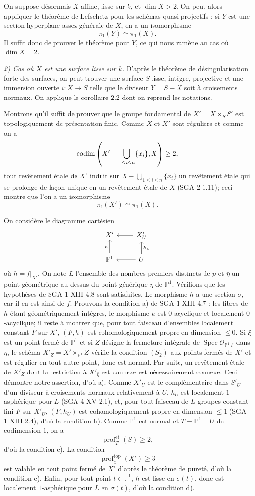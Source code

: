 \documentclass[11pt]{article}
\providecommand{\Spec}{\operatorname{Spec}}
\providecommand{\cO}{\mathcal O}
\providecommand{\et}{\mathrm{et}}
\providecommand{\prof}{\operatorname{prof}}
\begin{document}
On suppose désormais $X$ affine, lisse sur $k$, et $\dim X>2$. On peut alors appliquer le théorème de Lefschetz pour les schémas quasi-projectifs : si $Y$ est une section hyperplane assez générale de $X$, on a un isomorphisme
\[
 \pi_1(Y)\simeq \pi_1(X).
\]
Il suffit donc de prouver le théorème pour $Y$, ce qui nous ramène au cas où $\dim X=2$.

\emph{2) Cas où $X$ est une surface lisse sur $k$.} D'après le théorème de désingularisation forte des surfaces, on peut trouver une surface $S$ lisse, intègre, projective et une immersion ouverte $i:X\to S$ telle que le diviseur $Y=S-X$ soit à croisements normaux. On applique le corollaire 2.2 dont on reprend les notations.

Montrons qu'il suffit de prouver que le groupe fondamental de $X'=X\times_S S'$ est topologiquement de présentation finie. Comme $X$ et $X'$ sont réguliers et comme on a
\[
 \operatorname{codim}\left(X'-\bigcup_{1\le i\le n}\{x_i\},X\right)\ge2,
\]
tout revêtement étale de $X'$ induit sur $X-\bigcup_{1\le i\le n}\{x_i\}$ un revêtement étale qui se prolonge de façon unique en un revêtement étale de $X$ (SGA 2 1.11); ceci montre que l'on a un isomorphisme
\[
 \pi_1(X')\simeq \pi_1(X).
\]

On considère le diagramme cartésien
\[
\begin{tikzcd}
X' & X'_U \arrow[l]\\
\mathbb P^1 \arrow[u,"h"] & U \arrow[l] \arrow[u,"h_U"']
\end{tikzcd}
\]
où $h=f|_{X'}$. On note $L$ l'ensemble des nombres premiers distincts de $p$ et $\bar\eta$ un point géométrique au-dessus du point générique $\eta$ de $\mathbb P^1$. Vérifions que les hypothèses de SGA 1 XIII 4.8 sont satisfaites. Le morphisme $h$ a une section $\sigma$, car il en est ainsi de $f$. Prouvons la condition a) de SGA 1 XIII 4.7 : les fibres de $h$ étant géométriquement intègres, le morphisme $h$ est $0$-acyclique et localement $0$-acyclique; il reste à montrer que, pour tout faisceau d'ensembles localement constant $F$ sur $X'$, $(F,h)$ est cohomologiquement propre en dimension $\le0$. Si $\xi$ est un point fermé de $\mathbb P^1$ et si $Z$ désigne la fermeture intégrale de $\Spec \cO_{\mathbb P^1,\xi}$ dans $\bar\eta$, le schéma $X'_Z=X'\times_{\mathbb P^1}Z$ vérifie la condition $(S_2)$ aux points fermés de $X'$ et est régulier en tout autre point, donc est normal. Par suite, un revêtement étale de $X'_Z$ dont la restriction à $X'_{\bar\eta}$ est connexe est nécessairement connexe. Ceci démontre notre assertion, d'où a). Comme $X'_U$ est le complémentaire dans $S'_U$ d'un diviseur à croisements normaux relativement à $U$, $h_U$ est localement $1$-asphérique pour $L$ (SGA 4 XV 2.1), et, pour tout faisceau de $L$-groupes constant fini $F$ sur $X'_U$, $(F,h_U)$ est cohomologiquement propre en dimension $\le1$ (SGA 1 XIII 2.4), d'où la condition b). Comme $\mathbb P^1$ est normal et $T=\mathbb P^1-U$ de codimension $1$, on a
\[
 \prof^{\et}_T(S)\ge2,
\]
d'où la condition c). La condition
\[
 \prof^{\mathrm{top}}_x(X')\ge3
\]
est valable en tout point fermé de $X'$ d'après le théorème de pureté, d'où la condition e). Enfin, pour tout point $t\in\mathbb P^1$, $h$ est lisse en $\sigma(t)$, donc est localement $1$-asphérique pour $L$ en $\sigma(t)$, d'où la condition d).
\end{document}
